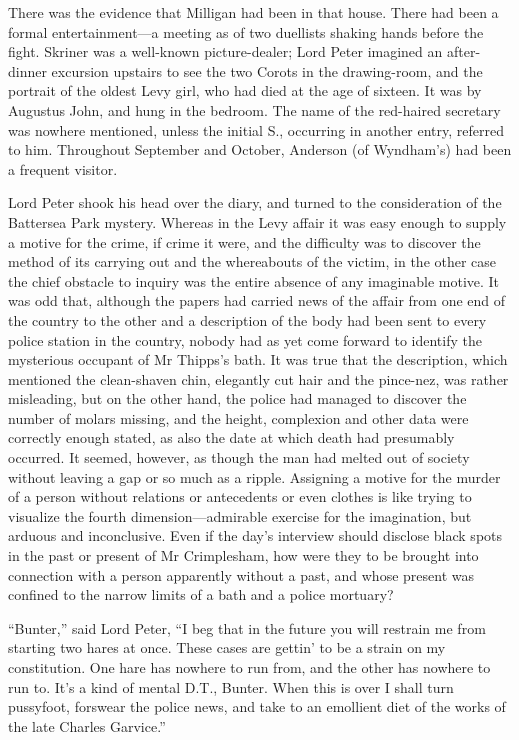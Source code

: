 There was the evidence that Milligan had been in that house. There had been a formal entertainment\allowbreak---\allowbreak a meeting as of two duellists shaking hands before the fight. Skriner was a well-known picture-dealer; Lord Peter imagined an after-dinner excursion upstairs to see the two Corots in the drawing-room, and the portrait of the oldest Levy girl, who had died at the age of sixteen. It was by Augustus John, and hung in the bedroom. The name of the red-haired secretary was nowhere mentioned, unless the initial S., occurring in another entry, referred to him. Throughout September and October, Anderson (of Wyndham’s) had been a frequent visitor.

Lord Peter shook his head over the diary, and turned to the consideration of the Battersea Park mystery. Whereas in the Levy affair it was easy enough to supply a motive for the crime, if crime it were, and the difficulty was to discover the method of its carrying out and the whereabouts of the victim, in the other case the chief obstacle to inquiry was the entire absence of any imaginable motive. It was odd that, although the papers had carried news of the affair from one end of the country to the other and a description of the body had been sent to every police station in the country, nobody had as yet come forward to identify the mysterious occupant of Mr Thipps’s bath. It was true that the description, which mentioned the clean-shaven chin, elegantly cut hair and the pince-nez, was rather misleading, but on the other hand, the police had managed to discover the number of molars missing, and the height, complexion and other data were correctly enough stated, as also the date at which death had presumably occurred. It seemed, however, as though the man had melted out of society without leaving a gap or so much as a ripple. Assigning a motive for the murder of a person without relations or antecedents or even clothes is like trying to visualize the fourth dimension\allowbreak---\allowbreak admirable exercise for the imagination, but arduous and inconclusive. Even if the day’s interview should disclose black spots in the past or present of Mr Crimplesham, how were they to be brought into connection with a person apparently without a past, and whose present was confined to the narrow limits of a bath and a police mortuary?

\enquote{Bunter,} said Lord Peter, \enquote{I beg that in the future you will restrain me from starting two hares at once. These cases are gettin’ to be a strain on my constitution. One hare has nowhere to run from, and the other has nowhere to run to. It’s a kind of mental D.T., Bunter. When this is over I shall turn pussyfoot, forswear the police news, and take to an emollient diet of the works of the late Charles Garvice.}

